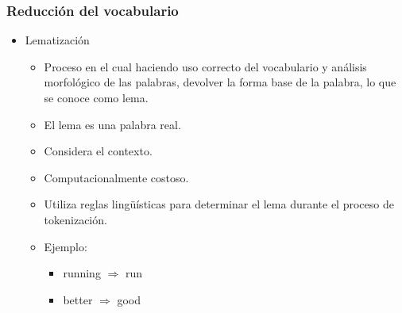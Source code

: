 \documentclass[
10pt, %
aspectratio=169, %
]{beamer}
\begin{document}
	\begin{frame}
		
		\frametitle{Reducción del vocabulario}
		
		\begin{itemize}
			\item Lematización
			
			\begin{itemize}
				\item Proceso en el cual haciendo uso correcto del vocabulario y análisis morfológico de las palabras, devolver la forma base de la palabra, lo que se conoce como lema.
				
				\item El lema es una palabra real.
				
				\item Considera el contexto.
				
				\item Computacionalmente costoso.
				
				\item Utiliza reglas lingüísticas para determinar el lema durante el proceso de tokenización.
				
				\pause
				\item Ejemplo: 
				\begin{itemize}
					\item running $\Rightarrow$ run
					\item better $\Rightarrow$ good
				\end{itemize}
				
			\end{itemize}
		
		\end{itemize}
		
	\end{frame}
	
	
\end{document}
